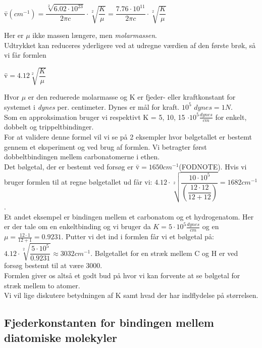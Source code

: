 \begin{center}
\={v}$(cm^{-1})=\dfrac{\sqrt[2]{6.02 \cdot 10^{23}}}{2 \pi c} \cdot \sqrt[2]{\dfrac{K}{\mu}} = \dfrac{7.76 \cdot 10^{11}}{2 \pi c} \cdot \sqrt[2]{\dfrac{K}{\mu}}$
\end{center}

Her er $\mu$ ikke massen længere, men \emph{molarmassen}.
\\
Udtrykket kan reduceres yderligere ved at udregne værdien af den  første brøk, så vi får formlen

\begin{center}
\={v}$=4.12 \sqrt[2]{\dfrac{K}{\mu}}$
\end{center}

Hvor $\mu$ er den reduerede molarmasse og K er fjeder- eller kraftkonstant for systemet i \emph{dynes} per. centimeter. Dynes er mål for kraft. $10^5$  $dynes = 1N$.
\\
Som en approksimation bruger vi respektivt K = 5, 10, 15 $\cdot 10^5 \frac{dynes}{cm}$ for enkelt, dobbelt og trippeltbindinger.
\\
For at validere denne formel vil vi se på 2 eksempler hvor bølgetallet er bestemt gennem et eksperiment og ved brug af formlen. Vi betragter først dobbeltbindingen mellem carbonatomerne i ethen.
\\
Det bølgetal, der er bestemt ved forsøg er \={v}$=1650cm^{-1}$(FODNOTE). Hvis vi bruger formlen til at regne bølgetallet ud får vi: $4.12 \cdot \sqrt[2]{\dfrac{10 \cdot 10^5}{(\dfrac{12 \cdot 12}{12 +12})}} = 1682 cm^{-1}$. 
\\

Et andet eksempel er bindingen mellem et carbonatom og et hydrogenatom. Her er der tale om en enkeltbinding og vi bruger da $K=5 \cdot 10^5 \frac{dynes}{cm}$ og en $\mu = \frac{12 \cdot 1}{12 + 1} = 0.9231$. Putter vi det ind i formlen får vi et bølgetal på: $4.12 \cdot \sqrt[2]{\dfrac{5 \cdot 10^5}{0.9231}} \approx 3032 cm^{-1}$. Bølgetallet for en stræk mellem C og H er ved forsøg bestemt til at være 3000. 
\\

Formlen giver os altså et godt bud på hvor vi kan forvente at se bølgetal for stræk mellem to atomer.
\\


Vi vil lige diskutere betydningen af K samt hvad der har indflydelse på størrelsen. 
\subsection{Fjederkonstanten for bindingen mellem diatomiske molekyler}

